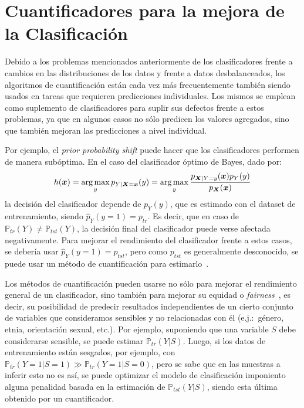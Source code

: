 \section{Cuantificadores para la mejora de la
Clasificación}\label{problema:mejora}

Debido a los problemas mencionados anteriormente de los clasificadores frente a
cambios en las distribuciones de los datos y frente a datos desbalanceados, los
algoritmos de cuantificación están cada vez más frecuentemente también siendo
usados en tareas que requieren predicciones individuales. Los mismos se emplean
como suplemento de clasificadores para suplir sus defectos frente a estos
problemas, ya que en algunos casos no sólo predicen los valores agregados, sino
que también mejoran las predicciones a nivel individual.

Por ejemplo, el {\it prior probability shift\/} puede hacer que los
clasificadores performen de manera subóptima. En el caso del clasificador óptimo
de Bayes, dado por:
\begin{equation}\label{ecuacion:bayes}
    h(\boldsymbol{x}) = \operatorname*{arg\,max}_{y} p_{Y|\boldsymbol{X}=\boldsymbol{x}}(y) = \operatorname*{arg\,max}_{y} \frac{p_{\boldsymbol{X}|Y=y}(\boldsymbol{x})p_Y(y)}{p_{\boldsymbol{X}}(\boldsymbol{x})}
\end{equation}
la decisión del clasificador depende de $p_Y(y)$, que es estimado con el dataset
de entrenamiento, siendo $\hat p_Y(y=1) = p_{tr}$. Es decir, que en caso de
$\mathbb{P}_{tr}(Y) \neq \mathbb{P}_{tst}(Y)$, la decisión final del
clasificador puede verse afectada negativamente. Para mejorar el rendimiento del
clasificador frente a estos casos, se debería usar $\hat p_Y(y=1) = p_{tst}$,
pero como $p_{tst}$ es generalmente desconocido, se puede usar un método de
cuantificación para estimarlo~\cite{saerens2002adjusting, alaiz2011class,
zhang2010transfer, xue2009quantification}.

Los métodos de cuantificación pueden usarse no sólo para mejorar el rendimiento
general de un clasificador, sino también para mejorar su equidad o {\it
fairness\/}~\cite{biswas2021ensuring}, es decir, su posibilidad de predecir
resultados independientes de un cierto conjunto de variables que consideramos
sensibles y no relacionadas con él (e.j.:~género, etnia, orientación sexual,
etc.). Por ejemplo, suponiendo que una variable $S$ debe considerarse sensible,
se puede estimar $\mathbb{P}_{tr}(Y|S)$. Luego, si los datos de entrenamiento
están sesgados, por ejemplo, con $\mathbb{P}_{tr}(Y=1|S=1) \gg
\mathbb{P}_{tr}(Y=1|S=0)$, pero se sabe que en las muestras a inferir esto no es
así, se puede optimizar el modelo de clasificación imponiento alguna penalidad
basada en la estimación de $\mathbb{P}_{tst}(Y|S)$, siendo esta última obtenido
por un cuantificador.
